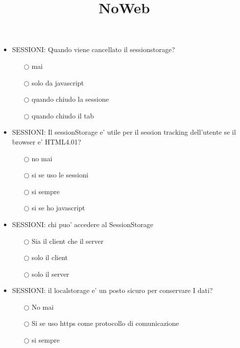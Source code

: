\documentclass[10pt,twocolumn]{article}
\title{NoWeb}
\begin{document}
\maketitle

\begin{itemize}
    \item SESSIONI: Quando viene cancellato il sessionstorage?
          \begin{itemize}
              \item[$\bigcirc$] mai
              \item[$\bigcirc$] solo da javascript
              \item[$\bigcirc$] quando chiudo la sessione
              \item[$\bigcirc$] quando chiudo il tab
          \end{itemize}
\end{itemize}
\begin{itemize}
    \item SESSIONI: Il sessionStorage e' utile per il session tracking dell'utente se il browser e' HTML4.01?
          \begin{itemize}
              \item[$\bigcirc$] no mai
              \item[$\bigcirc$] si se uso le sessioni
              \item[$\bigcirc$] si sempre
              \item[$\bigcirc$] si se ho javascript
          \end{itemize}
\end{itemize}
\begin{itemize}
    \item SESSIONI: chi puo' accedere al SessionStorage
          \begin{itemize}
              \item[$\bigcirc$] Sia il client che il server
              \item[$\bigcirc$] solo il client
              \item[$\bigcirc$] solo il server
          \end{itemize}
\end{itemize}
\begin{itemize}
    \item SESSIONI: il localstorage e' un posto sicuro per conservare I dati?
          \begin{itemize}
              \item[$\bigcirc$] No mai
              \item[$\bigcirc$] Si se uso https come protocollo di comunicazione
              \item[$\bigcirc$] si sempre
          \end{itemize}
\end{itemize}
\end{document}
